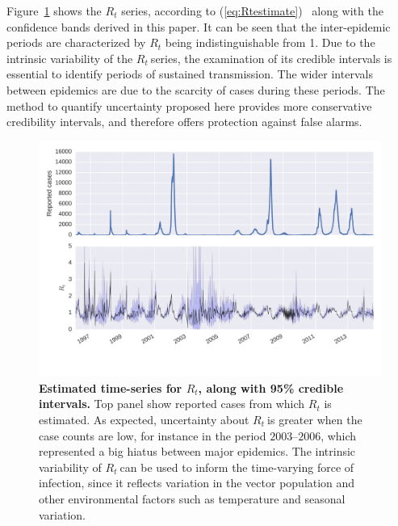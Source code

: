 \documentclass[10pt]{article}
\def \rr {$R_{t}\:$}
\begin{document}
Figure~\ref{fig:rtseries}  shows the $R_t$ series, according to 
(\ref{eq:Rtestimate})~\cite{nishiura} along with the confidence bands derived 
in this paper. 
It can be seen that the inter-epidemic periods are characterized by $R_t$ being 
indistinguishable from 1.
Due to the intrinsic variability of the \rr series, the examination of its 
credible intervals is essential to identify periods of sustained transmission.
The wider intervals between epidemics are due to the scarcity of cases during 
these periods.
The method to quantify uncertainty proposed here provides more conservative 
credibility intervals, and therefore offers protection against false alarms.
\begin{center}
\begin{figure}[!h]
 \centering
 \includegraphics[width=16cm]{./plots/rt_series.png}
 \caption{{\bf Estimated time-series for $R_t$, along with 95\% credible 
intervals.} Top panel show reported cases from which $R_t$ is estimated.
As expected, uncertainty about \rr is greater when the case counts are low, for 
instance in the period $2003$--$2006$, which represented a big hiatus between 
major epidemics.
The intrinsic variability of \rr can be used to inform the time-varying force 
of infection, since it reflects variation in the vector population and other 
environmental factors such as temperature and seasonal variation.}
\label{fig:rtseries}
\end{figure}
\end{center}
\end{document}
